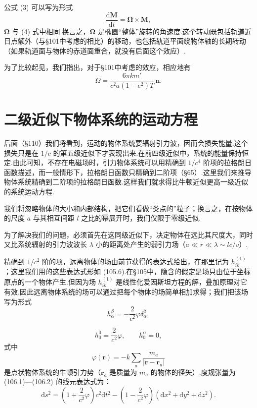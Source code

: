 \begin{xiti}
公式 (3) 可以写为形式
\begin{equation*}
  \frac{\mathrm{d}\boldsymbol{M}}{\mathrm{d}t}
  =\boldsymbol{\Omega}\times\boldsymbol{M},
\end{equation*}
$\boldsymbol{\Omega}$ 与 (4) 式中相同.换言之，$\boldsymbol{\Omega}$ 是椭圆“整体”旋转的角速度.这个转动既包括轨道近日点额外（与§101中考虑的相比）的移动，也包括轨道平面绕物体轴的长期转动（如果轨道面与物体的赤道面重合，就没有后面这个效应）.

为了比较起见，我们指出，对于§101中考虑的效应，相应地有
\begin{equation*}
  \Omega=\frac{6\pi km'}{c^{2}a(1-e^{2})T}\,\boldsymbol{n}.
\end{equation*}

\end{xiti}
\section{二级近似下物体系统的运动方程}

后面（§110）我们将看到，运动的物体系统要辐射引力波，因而会损失能量.这个损失只是在 $1/c$ 的第五级近似下才表现出来.在前四级近似中，系统的能量保持恒定.由此可知，不存在电磁场时，引力物体系统可以用精确到 $1/c^{4}$ 阶项的拉格朗日函数描述，而一般情形下，拉格朗日函数只精确到二阶项（§65）.这里我们来推导物体系统精确到二阶项的拉格朗日函数.这样我们就求得比牛顿近似更高一级近似的系统运动方程.

我们将忽略物体的大小和内部结构，把它们看做“类点的”粒子；换言之，在按物体的尺度 $a$ 与其相互间距 $l$ 之比的幂展开时，我们仅限于零级近似.

为了解决我们的问题，必须首先在这同级近似下，决定物体在远比其尺度大，同时又比系统辐射的引力波波长 $\lambda$ 小的距离处产生的弱引力场（$a\ll r\ll\lambda\sim lc/v$）.

精确到 $1/c^{2}$ 阶的项，远离物体的场由前节获得的表达式给出，在那里记为 $h_{ik}^{(1)}$；这里我们用的这些表达式形如 (105.6).在§105中，隐含的假定是场只由位于坐标原点的一个物体产生.但因为场 $h_{ik}^{(1)}$ 是线性化爱因斯坦方程的解，叠加原理对它有效.因此远离物体系统的场可以通过把每个物体的场简单相加求得；我们把该场写为形式
\begin{equation}
  h_{\alpha}^{\beta}=-\frac{2}{c^{2}}\varphi\delta_{\alpha}^{\beta},
\end{equation}

\begin{equation}
  h_0^0=\frac{2}{c^{2}}\varphi,\qquad h_0^{\alpha}=0,
\end{equation}
式中
\begin{equation*}
  \varphi(\boldsymbol{r})
  =-k\sum_a\frac{m_a}{|\boldsymbol{r}-\boldsymbol{r}_a|}
\end{equation*}
是点状物体系统的牛顿引力势（$\boldsymbol{r}_a$ 是质量为 $m_a$ 的物体的径矢）.度规张量为 (106.1)—(106.2) 的线元表达式为：
\begin{equation}
  \mathrm{d}s^{2}=\left(1+\frac{2}{c^{2}}\varphi\right)c^{2}\mathrm{d}t^{2}
  -\left(1-\frac{2}{c^{2}}\varphi\right)
  (\mathrm{d}x^{2}+\mathrm{d}y^{2}+\mathrm{d}z^{2}).
\end{equation}

